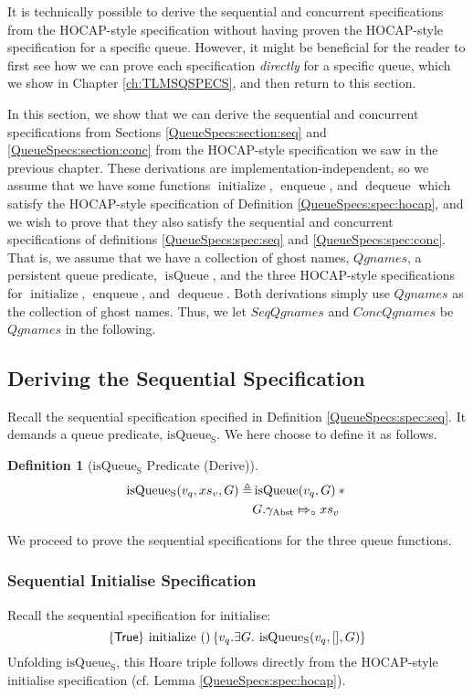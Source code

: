 \documentclass[a4paper, 10pt]{report}
\theoremstyle{definition}
\newtheorem{definition}{Definition}[section]
\newcommand{\initialise}{\operatorname{initialize}}
\newcommand{\enqueue}{\operatorname{enqueue}}
\newcommand{\dequeue}{\operatorname{dequeue}}
\newcommand{\isqueue}{\operatorname{isQueue}}
\newcommand{\isqueueseq}{\operatorname{isQueue_{S}}}
\newcommand{\SeqQgnames}{SeqQgnames}
\newcommand{\ConcQgnames}{ConcQgnames}
\newcommand{\Qgnames}{Qgnames}
\newcommand{\vq}{v_q}
\newcommand{\absvalueList}{xs_v}
\newcommand{\Qg}{G}
\newcommand{\gabst}{\gname_{\mathrm{Abst}}}
\newcommand{\abstractstatefullfrag}[2]{#1 \Mapsto_{\circ} #2}
\newcommand{\seqspecinitHTGen}[2]{\hoare{\TRUE}{\initialise \ \TT}{#1 . \Exists #2. \isqueueseq(#1, [], #2)}}
\newcommand{\seqspecinitGen}[2]{\seqspecinitHTGen{#1}{#2}}
\newcommand{\seqspecinit}{\seqspecinitGen{\vq}{\Qg}}
\begin{document}
It is technically possible to derive the sequential and concurrent specifications from the HOCAP-style specification without having proven the HOCAP-style specification for a specific queue. However, it might be beneficial for the reader to first see how we can prove each specification \textit{directly} for a specific queue, which we show in Chapter \ref{ch:TLMSQSPECS}, and then return to this section.

In this section, we show that we can derive the sequential and concurrent specifications from Sections \ref{QueueSpecs:section:seq} and \ref{QueueSpecs:section:conc} from the HOCAP-style specification we saw in the previous chapter. These derivations are implementation-independent, so we assume that we have some functions $\initialise$, $\enqueue$, and $\dequeue$ which satisfy the HOCAP-style specification of Definition \ref{QueueSpecs:spec:hocap}, and we wish to prove that they also satisfy the sequential and concurrent specifications of definitions \ref{QueueSpecs:spec:seq} and \ref{QueueSpecs:spec:conc}. That is, we assume that we have a collection of ghost names, $\Qgnames$, a persistent queue predicate, $\isqueue$, and the three HOCAP-style specifications for $\initialise$, $\enqueue$, and $\dequeue$. Both derivations simply use $\Qgnames$ as the collection of ghost names. Thus, we let $\SeqQgnames$ and $\ConcQgnames$ be $\Qgnames$ in the following.

\subsection{Deriving the Sequential Specification}
Recall the sequential specification specified in Definition \ref{QueueSpecs:spec:seq}. It demands a queue predicate, $\isqueueseq$. We here choose to define it as follows.
\begin{definition}[$\isqueueseq$ Predicate (Derive)]\label{QueueSpecs:spec:seq:isqueueseq_derive}
\begin{align*}
  \isqueueseq(\vq, \absvalueList, \Qg) \eqdef
    &\isqueue(\vq, \Qg) \star{}\\
    &\abstractstatefullfrag{\Qg.\gabst}{\absvalueList}
\end{align*}
\end{definition}
We proceed to prove the sequential specifications for the three queue functions.

\subsubsection{Sequential Initialise Specification}
Recall the sequential specification for initialise:
\begin{equation*}
  \seqspecinit
\end{equation*}
Unfolding $\isqueueseq$, this Hoare triple follows directly from the HOCAP-style initialise specification (cf. Lemma \ref{QueueSpecs:spec:hocap}).
\end{document}
